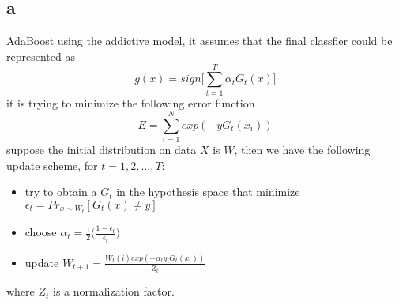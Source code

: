 \documentclass[12pt]{amsart}
\begin{document}
\subsection*{a}
AdaBoost using the addictive model, it assumes that
the final classfier could be represented as
$$
	g(x) = sign\big [ \sum_{t=1}^T \alpha_t G_t(x) \big ]
$$
it is trying to minimize the following error function
$$
	E = \sum_{i=1}^N exp(-y G_t(x_i))
$$
suppose the initial distribution on data $X$ is $W$, then we have the following
update scheme,
for $t = 1, 2, \ldots, T$:
\begin{itemize}
\item try to obtain a $G_t$ in the hypothesis space that minimize 
	$\epsilon_t = Pr_{x\sim W_t}[G_t(x) \neq y]$
\item choose $\alpha_t = \frac{1}{2} \big ( \frac{1-\epsilon_t}{\epsilon_t} \big )$
\item update $W_{t+1} = \frac{W_t(i)exp( -\alpha_t y_i G_t(x_i) )}{Z_t}$
\end{itemize}
where $Z_t$ is a normalization factor.
\end{document}

